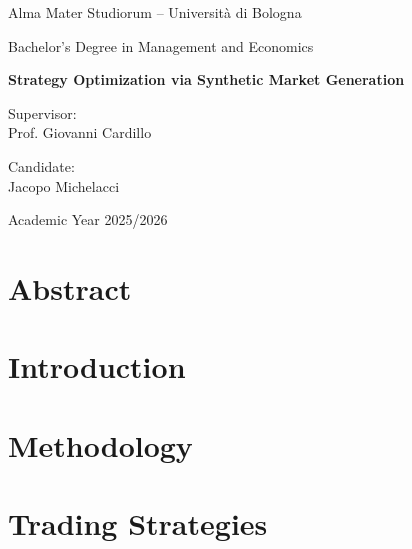 \documentclass[12pt,a4paper]{report}
\newcommand{\ThesisTitle}{Strategy Optimization via Synthetic Market Generation}
\newcommand{\AuthorName}{Jacopo Michelacci}
\newcommand{\SupervisorName}{Prof. Giovanni Cardillo}
\newcommand{\DegreeProgramme}{Bachelor's Degree in Management and Economics}
\newcommand{\AcademicYear}{2025/2026}
\begin{document}
\hypersetup{pageanchor=false}
\begin{titlepage}
    \begin{center}
        {\Large Alma Mater Studiorum -- Universit\`a di Bologna}

        \vspace{0.8cm}

        {\large \DegreeProgramme}

        \vspace{2.5cm}

        {\Huge\bfseries \ThesisTitle}

        \vfill

        \begin{minipage}{0.45\textwidth}
            \raggedright
            Supervisor:\\
            \SupervisorName
        \end{minipage}
        \hfill
        \begin{minipage}{0.45\textwidth}
            \raggedleft
            Candidate:\\
            \AuthorName
        \end{minipage}

        \vspace{2cm}

        Academic Year \AcademicYear
    \end{center}
\end{titlepage}
\hypersetup{pageanchor=true}


\chapter*{Abstract}


\tableofcontents
\clearpage


\chapter{Introduction}


\chapter{Methodology}


\chapter{Trading Strategies}

\end{document}

